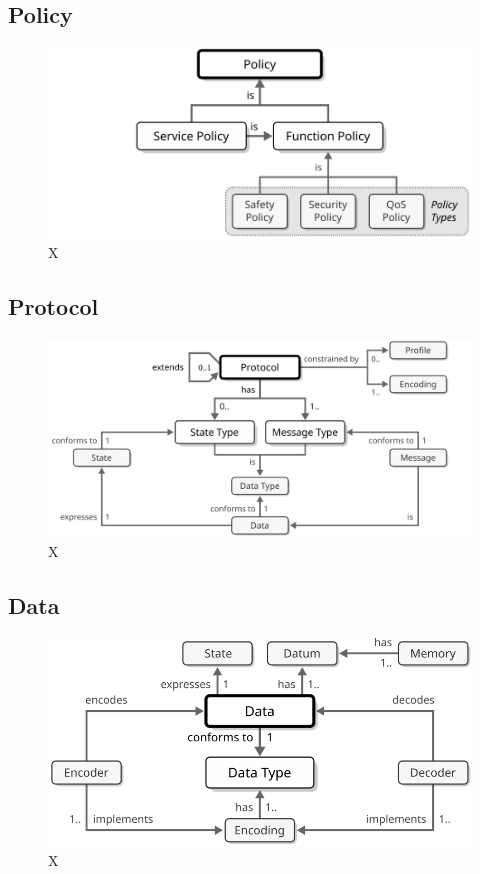 \newpage

\subsection{Policy}
\label{sec:reference-model:policy}

\begin{figure}[ht!]
  \centering
  \includegraphics[scale=0.9]{figures/policy}
  \caption{
    X
  }
  \label{fig:policy}
\end{figure}

\subsection{Protocol}
\label{sec:reference-model:protocol}

\begin{figure}[ht!]
  \centering
  \includegraphics[scale=0.9]{figures/protocol}
  \caption{
    X
  }
  \label{fig:protocol}
\end{figure}

\newpage

\subsection{Data}
\label{sec:reference-model:data}

\begin{figure}[ht!]
  \centering
  \includegraphics[scale=0.9]{figures/data}
  \caption{
    X
  }
  \label{fig:data}
\end{figure}